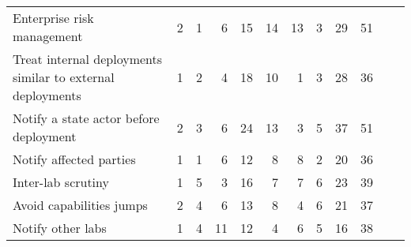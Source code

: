 \documentclass{article}
\begin{document}
\begin{sidewaystable}
\begin{tabular}{l *{11}{r}}
Enterprise risk management & 2 & 1 & 6 & 15 & 14 & 13 & 3 & 29 & 51 \\
Treat internal deployments similar to external deployments & 1 & 2 & 4 & 18 & 10 & 1 & 3 & 28 & 36 \\
Notify a state actor before deployment & 2 & 3 & 6 & 24 & 13 & 3 & 5 & 37 & 51 \\
Notify affected parties & 1 & 1 & 6 & 12 & 8 & 8 & 2 & 20 & 36 \\
Inter-lab scrutiny & 1 & 5 & 3 & 16 & 7 & 7 & 6 & 23 & 39 \\
Avoid capabilities jumps & 2 & 4 & 6 & 13 & 8 & 4 & 6 & 21 & 37 \\
Notify other labs & 1 & 4 & 11 & 12 & 4 & 6 & 5 & 16 & 38 \\
\bottomrule
\end{tabular}
\end{sidewaystable}
\end{document}
